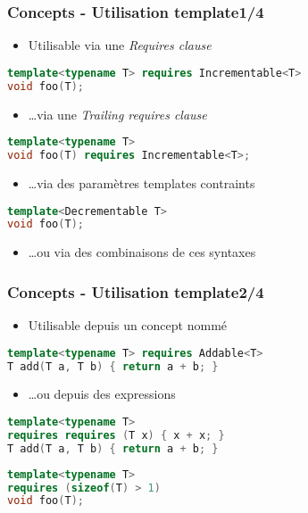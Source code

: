 \documentclass[C++.tex]{subfiles}
\begin{document}
\begin{frame}[fragile]
	\frametitle{Concepts - Utilisation template\titlehfill{}1/4}
	\begin{itemize}
		\item Utilisable via une \textit{Requires clause}
	\end{itemize}

	\begin{lstlisting}[language=C++]
template<typename T> requires Incrementable<T>
void foo(T);\end{lstlisting}

	\begin{itemize}
		\item \ldots via une \textit{Trailing requires clause}
	\end{itemize}

	\begin{lstlisting}[language=C++]
template<typename T>
void foo(T) requires Incrementable<T>;\end{lstlisting}

	\begin{itemize}
		\item \ldots via des paramètres templates contraints
	\end{itemize}

	\begin{lstlisting}[language=C++]
template<Decrementable T>
void foo(T);\end{lstlisting}

	\begin{itemize}
		\item \ldots ou via des combinaisons de ces syntaxes
	\end{itemize}
\end{frame}

\begin{frame}[fragile]
	\frametitle{Concepts - Utilisation template\titlehfill{}2/4}
	\begin{itemize}
		\item Utilisable depuis un concept nommé
	\end{itemize}

	\begin{lstlisting}[language=C++]
template<typename T> requires Addable<T>
T add(T a, T b) { return a + b; }\end{lstlisting}

	\begin{itemize}
		\item \ldots ou depuis des expressions
	\end{itemize}
 
	\begin{lstlisting}[language=C++]
template<typename T>
requires requires (T x) { x + x; }
T add(T a, T b) { return a + b; }\end{lstlisting}

	\begin{lstlisting}[language=C++]
template<typename T>
requires (sizeof(T) > 1)
void foo(T);\end{lstlisting}

\end{frame}
\end{document}
